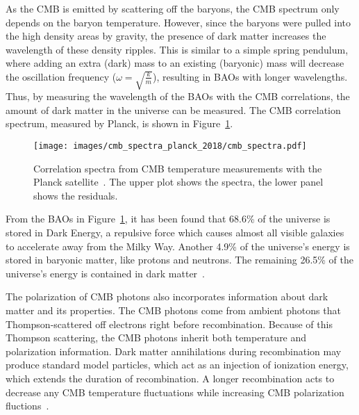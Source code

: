     As the CMB is emitted by scattering off the baryons, the CMB spectrum only depends on the baryon temperature.
    However, since the baryons were pulled into the high density areas by gravity, the presence of dark matter increases the wavelength of these density ripples.
    This is similar to a simple spring pendulum, where adding an extra (dark) mass to an existing (baryonic) mass will decrease the oscillation frequency ($\omega = \sqrt{\frac{k}{m}}$), resulting in BAOs with longer wavelengths.
    Thus, by measuring the wavelength of the BAOs with the CMB correlations, the amount of dark matter in the universe can be measured.
    The CMB correlation spectrum, measured by Planck, is shown in Figure~\ref{fig:cmb_correlation_spectra}.
    
    \begin{figure}[ht]
      \centering
      \texttt{[image: images/cmb\_spectra\_planck\_2018/cmb\_spectra.pdf]}
      \caption[Cosmic Micrwave Background Correlation Spectrum]{
        Correlation spectra from CMB temperature measurements with the Planck satellite~\cite{planck_dm_limit}.
        The upper plot shows the spectra, the lower panel shows the residuals.
      }
      \label{fig:cmb_correlation_spectra}
    \end{figure}
    
    From the BAOs in Figure~\ref{fig:cmb_correlation_spectra}, it has been found that 68.6\% of the universe is stored in Dark Energy, a repulsive force which causes almost all visible galaxies to accelerate away from the Milky Way.
    Another 4.9\% of the universe's energy is stored in baryonic matter, like protons and neutrons.
    The remaining 26.5\% of the universe's energy is contained in dark matter~\cite{planck2015}.
    
    The polarization of CMB photons also incorporates information about dark matter and its properties.
    The CMB photons come from ambient photons that Thompson-scattered off electrons right before recombination.
    Because of this Thompson scattering, the CMB photons inherit both temperature and polarization information.
    Dark matter annihilations during recombination may produce standard model particles, which act as an injection of ionization energy, which extends the duration of recombination.
    A longer recombination acts to decrease any CMB temperature fluctuations while increasing CMB polarization fluctions~\cite{cmb_polarization1,cmb_polarization2}.
    
